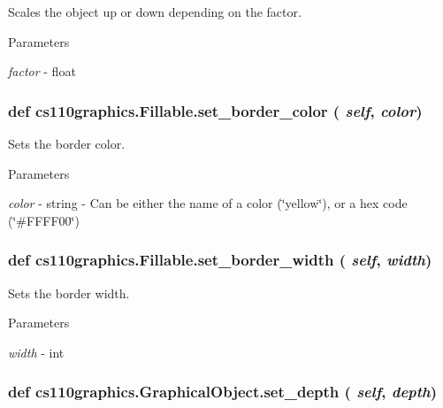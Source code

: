 Scales the object up or down depending on the factor. 
\begin{DoxyParams}{Parameters}
\item[{\em factor}]-\/ float \end{DoxyParams}
\hypertarget{classcs110graphics_1_1Fillable_a2f830be5d970faac97759910d20d68a4}{
\subsubsection[{set\_\-border\_\-color}]{\setlength{\rightskip}{0pt plus 5cm}def cs110graphics.Fillable.set\_\-border\_\-color ( {\em self}, \/   {\em color})}}
\label{classcs110graphics_1_1Fillable_a2f830be5d970faac97759910d20d68a4}


Sets the border color. 
\begin{DoxyParams}{Parameters}
\item[{\em color}]-\/ string -\/ Can be either the name of a color (\char`\"{}yellow\char`\"{}), or a hex code (\char`\"{}\#FFFF00\char`\"{}) \end{DoxyParams}
\hypertarget{classcs110graphics_1_1Fillable_a09f05462cb2ed38fdccb244340f05b2b}{
\subsubsection[{set\_\-border\_\-width}]{\setlength{\rightskip}{0pt plus 5cm}def cs110graphics.Fillable.set\_\-border\_\-width ( {\em self}, \/   {\em width})}}
\label{classcs110graphics_1_1Fillable_a09f05462cb2ed38fdccb244340f05b2b}


Sets the border width. 
\begin{DoxyParams}{Parameters}
\item[{\em width}]-\/ int \end{DoxyParams}
\hypertarget{classcs110graphics_1_1GraphicalObject_a20d76d4ee4419c3065d61deb6cbc6700}{
\subsubsection[{set\_\-depth}]{\setlength{\rightskip}{0pt plus 5cm}def cs110graphics.GraphicalObject.set\_\-depth ( {\em self}, \/   {\em depth})}}
\label{classcs110graphics_1_1GraphicalObject_a20d76d4ee4419c3065d61deb6cbc6700}


